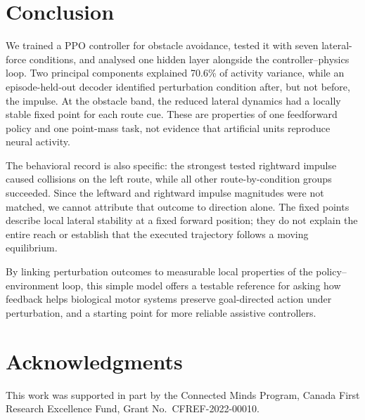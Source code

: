 \documentclass{article}
\begin{document}
\section{Conclusion}

We trained a PPO controller for obstacle avoidance, tested it with
seven lateral-force conditions, and analysed one hidden layer alongside
the controller--physics loop. Two principal components explained 70.6\%
of activity variance, while an episode-held-out decoder identified
perturbation condition after, but not before, the impulse. At the obstacle
band, the reduced lateral dynamics had a locally stable fixed point for
each route cue. These are properties of one feedforward policy and one
point-mass task, not evidence that artificial units reproduce neural
activity.

The behavioral record is also specific: the strongest tested rightward
impulse caused collisions on the left route, while all other
route-by-condition groups succeeded. Since the leftward and rightward
impulse magnitudes were not matched, we cannot attribute that outcome to
direction alone. The fixed points describe local lateral stability at a
fixed forward position; they do not explain the entire reach or establish
that the executed trajectory follows a moving equilibrium.

By linking perturbation outcomes to measurable local properties of the
policy--environment loop, this simple model offers a testable reference for
asking how feedback helps biological motor systems preserve goal-directed
action under perturbation, and a starting point for more reliable assistive
controllers.

\section*{Acknowledgments}

This work was supported in part by the Connected Minds Program,
Canada First Research Excellence Fund,
Grant No.~CFREF-2022-00010.



\end{document}
